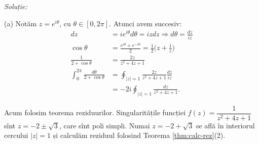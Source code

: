 \emph{Soluție:}

(a) Notăm $ z = e^{i\theta} $, cu $ \theta \in [0, 2\pi] $. Atunci avem succesiv:
\begin{align*}
  dz &= ie^{i\theta} d\theta = izdz \Rightarrow d\theta = \frac{dz}{iz} \\
  \cos \theta &= \frac{e^{i\theta} + e^{-i\theta}}{2} = \frac{1}{2} \Big( z + \frac{1}{z} \Big) \\
  \frac{1}{2 + \cos \theta} &= \frac{2z}{z^2 + 4z + 1} \\
  \int_0^{2 \pi} \frac{d\theta}{2 + \cos \theta} &= \oint_{|z| = 1} \frac{2z}{z^2 + 4z + 1} \frac{dz}{iz} \\
     &= -2i \oint_{|z| = 1} \frac{dz}{z^2 + 4z + 1}.
\end{align*}

Acum folosim teorema reziduurilor. Singularitățile funcției $ f(z) = \dfrac{1}{z^2 + 4z + 1} $
sînt $ z = -2 \pm \sqrt{3} $, care sînt poli simpli. Numai $ z = -2 + \sqrt{3} $ se află
în interiorul cercului $ |z| = 1 $ și calculăm reziduul folosind
Teorema \ref{thm:calc-rez}(2).

